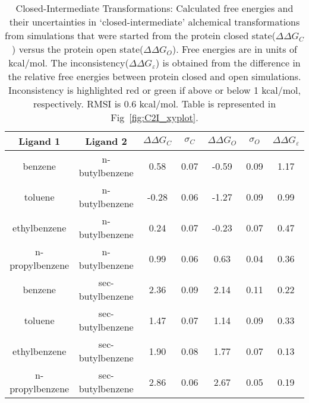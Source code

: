 \begin{table}[!htb]
\centering
\caption{Closed-Intermediate Transformations: 
 Calculated free energies and their uncertainties in `closed-intermediate' alchemical transformations from simulations that were started from the protein closed state(\boldmath$\Delta\Delta G_{C}$) versus the protein open state(\boldmath$\Delta\Delta G_{O}$).
 Free energies are in units of kcal/mol. 
 The inconsistency(\boldmath$\Delta\Delta G_{\varepsilon}$) is obtained from the difference in the relative free energies between protein closed and open simulations. 
 Inconsistency is highlighted red or green if above or below 1 kcal/mol, respectively.
 RMSI is 0.6 kcal/mol.
 Table is represented in Fig~\ref{fig:C2I_xyplot}.
}
\label{tbl:C-I}
\begin{tabular}{|c|c|c|c|c|c|c|}
\hline
\textbf{Ligand 1}       & \textbf{Ligand 2}    & \boldmath$\Delta\Delta G_{C}$ & \boldmath$\sigma_{C}$ & \boldmath$\Delta\Delta G_{O}$ & \boldmath$\sigma_{O}$ & \boldmath$\Delta\Delta G_{\varepsilon}$            \\ \hline
benzene         & n-butylbenzene   & 0.58                                   & 0.07                       & -0.59                                & 0.09                       & \cellcolor[HTML]{FFCCC9}1.17 \\ \hline
toluene         & n-butylbenzene   & -0.28                                  & 0.06                       & -1.27                                & 0.09                      & \cellcolor[HTML]{9AFF99}0.99 \\ \hline
ethylbenzene    & n-butylbenzene   & 0.24                                   & 0.07                       & -0.23                                & 0.07                       & \cellcolor[HTML]{9AFF99}0.47 \\ \hline
n-propylbenzene & n-butylbenzene   & 0.99                                   & 0.06                       & 0.63                                 & 0.04                       & \cellcolor[HTML]{9AFF99}0.36 \\ \hline
benzene         & sec-butylbenzene & 2.36                                   & 0.09                       & 2.14                                 & 0.11                       & \cellcolor[HTML]{9AFF99}0.22 \\ \hline
toluene         & sec-butylbenzene & 1.47                                   & 0.07                       & 1.14                                 & 0.09                      & \cellcolor[HTML]{9AFF99}0.33 \\ \hline
ethylbenzene    & sec-butylbenzene & 1.90                                   & 0.08                       & 1.77                                 & 0.07                       & \cellcolor[HTML]{9AFF99}0.13 \\ \hline
n-propylbenzene & sec-butylbenzene & 2.86                                   & 0.06                       & 2.67                                 & 0.05                      & \cellcolor[HTML]{9AFF99}0.19 \\ \hline
\end{tabular}
\end{table}


